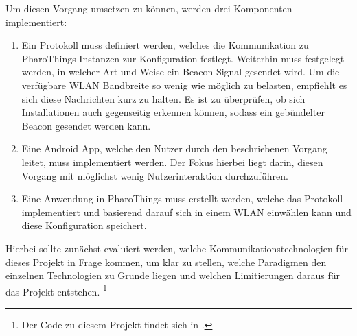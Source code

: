     Um diesen Vorgang umsetzen zu können, werden drei Komponenten implementiert:
    \begin{enumerate}
        \item Ein Protokoll muss definiert werden, welches die Kommunikation zu PharoThings Instanzen zur Konfiguration festlegt.
        Weiterhin muss festgelegt werden, in welcher Art und Weise ein Beacon-Signal gesendet wird.
        Um die verfügbare WLAN Bandbreite so wenig wie möglich zu belasten, empfiehlt es sich diese Nachrichten kurz zu halten. Es ist zu überprüfen,
        ob sich Installationen auch gegenseitig erkennen können, sodass ein gebündelter Beacon gesendet werden kann.
        \item Eine Android App, welche den Nutzer durch den beschriebenen Vorgang leitet, muss implementiert werden.
        Der Fokus hierbei liegt darin, diesen Vorgang mit möglichst wenig Nutzerinteraktion durchzuführen.
        \item Eine Anwendung in PharoThings muss erstellt werden, welche das Protokoll implementiert
        und basierend darauf sich in einem WLAN einwählen kann und diese Konfiguration speichert.
    \end{enumerate}

    Hierbei sollte zunächst evaluiert werden, welche Kommunikationstechnologien für dieses Projekt in Frage kommen, um klar zu stellen, welche Paradigmen den einzelnen Technologien zu Grunde liegen und welchen Limitierungen daraus für das Projekt entstehen. \footnote{Der Code zu diesem Projekt findet sich in \cite{AI-main-repository}.}

